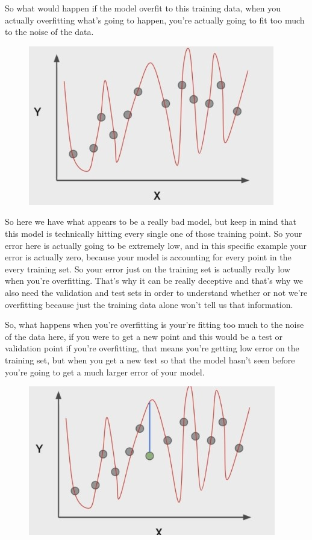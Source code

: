 \documentclass[12pt]{article}
\begin{document}
\begin{itemize}
	So what would happen if the model overfit to this training data, when you actually overfitting what's going to happen, you're actually going to fit too much to the noise of the data.
	\begin{figure}[htbp]
\centerline{\includegraphics[scale=.5]{img/overfittingnoise.jpg}}
\end{figure}

	So here we have what appears to be a really bad model, but keep in mind that this model is technically hitting every single one of those training point. So your error here is actually going to be extremely low, and in this specific example your error is actually zero, because your model is accounting for every point in the every training set. So your error just on the training set is actually really low when you're overfitting. That's why it can be really deceptive and that's why we also need the validation and test sets in order to understand whether or not we're overfitting because just the training data alone won't tell us that information. 
	
	So, what happens when you're overfitting is your're fitting too much to the noise of the data here, if you were to get a new point and this would be a test or validation point if you're overfitting, that means you're getting low error on the training set, but when you get a new test so that the model hasn't seen before you're going to get a much larger error of your model.
		\begin{figure}[htbp]
\centerline{\includegraphics[scale=.5]{img/overfittingLargerError.jpg}}
\end{figure}



\end{itemize}
\end{document}
